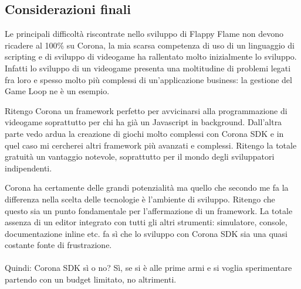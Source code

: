 		
		\subsection{Considerazioni finali}
			Le principali difficoltà riscontrate nello sviluppo di Flappy Flame non devono ricadere al 100\% su Corona, la mia scarsa competenza di uso di un linguaggio di scripting e di sviluppo di videogame ha rallentato molto inizialmente lo sviluppo. Infatti lo sviluppo di un videogame presenta una moltitudine di problemi legati fra loro e spesso molto più complessi di un’applicazione business: la gestione del Game Loop ne è un esempio.
			
			Ritengo Corona un framework perfetto per avvicinarsi alla programmazione di videogame soprattutto per chi ha già un Javascript in background. Dall'altra parte vedo ardua la creazione di giochi molto complessi con Corona SDK e in quel caso mi cercherei altri framework più avanzati e complessi. Ritengo la totale gratuità un vantaggio notevole, soprattutto per il mondo degli sviluppatori indipendenti. 
			
			Corona ha certamente delle grandi potenzialità ma quello che secondo me fa la differenza nella scelta delle tecnologie è l’ambiente di sviluppo. Ritengo che questo sia un punto fondamentale per l’affermazione di un framework. La totale assenza di un editor integrato con tutti gli altri strumenti: simulatore, console, documentazione inline etc. fa sì che lo sviluppo con Corona SDK sia una quasi costante fonte di frustrazione.
			
			\paragraph{} Quindi: Corona SDK sì o no? Sì, se si è alle prime armi e si voglia sperimentare partendo con un budget limitato, no altrimenti.
			
		

